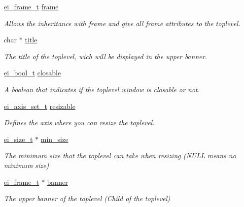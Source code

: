 \begin{DoxyCompactItemize}
\item 
\hyperlink{structei__frame__t}{ei\+\_\+frame\+\_\+t} \hyperlink{structei__toplevel__t_a03509f8ae2983cc3777569d7e10deae6}{frame}
\begin{DoxyCompactList}\small\item\em Allows the inheritance with frame and give all frame attributes to the toplevel. \end{DoxyCompactList}\item 
char $\ast$ \hyperlink{structei__toplevel__t_ad3b3d6a03d225a21c7b414357c678b1b}{title}
\begin{DoxyCompactList}\small\item\em The title of the toplevel, wich will be displayed in the upper banner. \end{DoxyCompactList}\item 
\hyperlink{ei__types_8h_a383b9af13bd6a0a893096ead3c4d8e28}{ei\+\_\+bool\+\_\+t} \hyperlink{structei__toplevel__t_a462595f505435050c9e1362fedd71fe5}{closable}
\begin{DoxyCompactList}\small\item\em A boolean that indicates if the toplevel window is closable or not. \end{DoxyCompactList}\item 
\hyperlink{ei__types_8h_ab5d9ff46ba9b2c9fa6d6fbd2594c6439}{ei\+\_\+axis\+\_\+set\+\_\+t} \hyperlink{structei__toplevel__t_a20ca606f2d466eaab1996942d989f11b}{resizable}
\begin{DoxyCompactList}\small\item\em Defines the axis where you can resize the toplevel. \end{DoxyCompactList}\item 
\hyperlink{structei__size__t}{ei\+\_\+size\+\_\+t} $\ast$ \hyperlink{structei__toplevel__t_a0eda3e2e2012df72477221731a6c2bd3}{min\+\_\+size}
\begin{DoxyCompactList}\small\item\em The minimum size that the toplevel can take when resizing (N\+U\+L\+L means no minimum size) \end{DoxyCompactList}\item 
\hyperlink{structei__frame__t}{ei\+\_\+frame\+\_\+t} $\ast$ \hyperlink{structei__toplevel__t_a0adebbd97cffba4f38d5f7da127ba8fd}{banner}
\begin{DoxyCompactList}\small\item\em The upper banner of the toplevel (Child of the toplevel) \end{DoxyCompactList}\item 

\end{DoxyCompactItemize}
